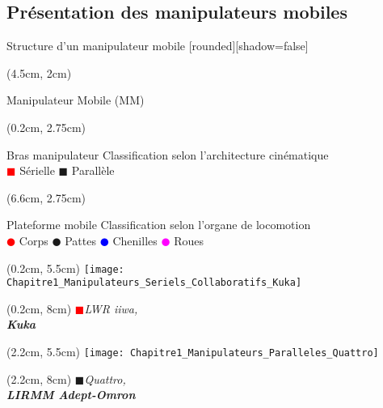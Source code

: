 \documentclass[french]{beamer}
\begin{document}
\subsection{Présentation des manipulateurs mobiles}
\begin{frame}{Structure d'un manipulateur mobile}
[rounded][shadow=false]
{\scriptsize 
\begin{textblock*}{3.8cm}(4.5cm, 2cm) %
 \begin{block}{}
  \centering
  Manipulateur Mobile (MM)
 \end{block}
\end{textblock*}

\begin{textblock*}{6cm}(0.2cm, 2.75cm)
 \begin{block}{Bras manipulateur}
  Classification selon l'architecture cinématique\\
  \textcolor{red}{$\blacksquare$} Sérielle \textcolor{vert}{$\blacksquare$} Parallèle 
 \end{block}
\end{textblock*}

\begin{textblock*}{6cm}(6.6cm, 2.75cm)
 \begin{block}{Plateforme mobile}
  Classification selon l'organe de locomotion\\
  \textcolor{red}{$\CIRCLE$} Corps
  \textcolor{vert}{$\CIRCLE$} Pattes
  \textcolor{blue}{$\CIRCLE$} Chenilles
  \textcolor{magenta}{$\CIRCLE$} Roues
 \end{block}
\end{textblock*}
}

\begin{textblock*}{2cm}(0.2cm, 5.5cm)
\texttt{[image: Chapitre1\_Manipulateurs\_Seriels\_Collaboratifs\_Kuka]}
\end{textblock*}
\begin{textblock*}{2cm}(0.2cm, 8cm)
\centering
\tiny{\textcolor{red}{$\blacksquare$}\textit{LWR iiwa,\\ \textbf{Kuka}}}\\
\end{textblock*}

\begin{textblock*}{2cm}(2.2cm, 5.5cm)
\texttt{[image: Chapitre1\_Manipulateurs\_Paralleles\_Quattro]}
\end{textblock*}
\begin{textblock*}{2cm}(2.2cm, 8cm)
\centering
\tiny{\textcolor{vert}{$\blacksquare$}\textit{Quattro,\\ \textbf{LIRMM Adept-Omron}}}\\
\end{textblock*}


\end{frame}
\end{document}
